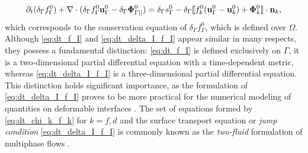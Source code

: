 \begin{equation}
    \pddt (\delta_\Gamma f_\Gamma^0)  
    + \div (
        \delta_\Gamma  f_\Gamma^0 \textbf{u}_\Gamma^0
        - \delta_\Gamma  \mathbf{\Phi}_{\Gamma||}^0 
        )
    = 
    \delta_\Gamma s_\Gamma^0
    - \delta_\Gamma \Jump{
    f_k^0 (\textbf{u}_\Gamma^0 - \textbf{u}_k^0)
    + \mathbf{\Phi}_k^0},
    \label{eq:dt_delta_I_f_I}
\end{equation}
which corresponds to the conservation equation of $\delta_\Gamma f_\Gamma^0$, which is defined over $\Omega$.
Although \ref{eq:dt_f_I} and \ref{eq:dt_delta_I_f_I} appear similar in many respects, they possess a fundamental distinction: \ref{eq:dt_f_I} is defined exclusively on $\Gamma$, it is a two-dimensional partial differential equation with a time-dependent metric, whereas \ref{eq:dt_delta_I_f_I} is a three-dimensional partial differential equation. 
This distinction holds significant importance, as the formulation of \ref{eq:dt_delta_I_f_I} proves to be more practical for the numerical modeling of quantities on deformable interfaces \citep{teigen2009}. %
The set of equations formed by \ref{eq:dt_chi_k_f_k} for $k = f,d$ and the surface transport equation or \textit{jump condition} \eqref{eq:dt_delta_I_f_I} is commonly known as the \textit{two-fluid} formulation of multiphase flows \citep{morel2015mathematical,tryggvason2011direct,drew1983mathematical,kataoka1986local}. 

